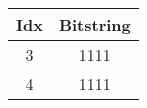 \documentclass{standalone}
\begin{document}
	\begin{tabular}{cc}
		\toprule
		Idx & Bitstring \\
		\midrule
		\rowcolor{CBThree}
		3 & 1111 \\
		\rowcolor{CBFour}
		4 & 1111 \\
		\bottomrule
	\end{tabular}
\end{document}
